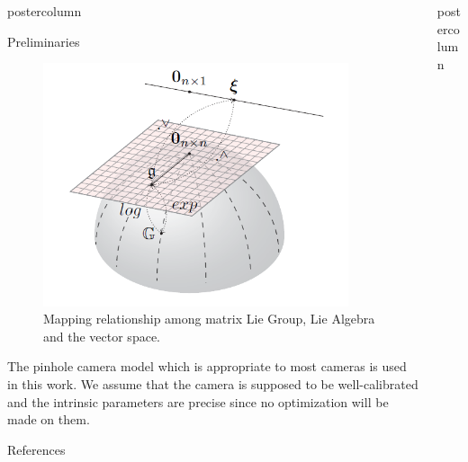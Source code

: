 \documentclass{beamer}
\newlength{\columnheight}
\begin{document}
\begin{frame}
\begin{columns}
\begin{column}{.4\textwidth}
\begin{beamercolorbox}[center]{postercolumn}
\begin{minipage}{.98\textwidth}
{\begin{block}{Preliminaries}
\begin{figure}
							\begin{minipage}{0.45\textwidth}
                    \includegraphics[width=0.9\textwidth]{img/lie.png}
								\caption{Mapping relationship among matrix Lie Group, Lie Algebra and the vector space.}
							\end{minipage}
						\end{figure}
\vspace{1em}
The pinhole camera model which is appropriate to most cameras is used in this work. We assume that the camera is supposed to be well-calibrated and the intrinsic parameters are precise since no optimization will be made on them.  
\end{block}


					\begin{myblock}{References}
						\footnotesize
						
						
					\end{myblock}\vfill

		}\end{minipage}\end{beamercolorbox}
	\end{column}
	\begin{column}{.57\textwidth}
		\begin{beamercolorbox}[center]{postercolumn}
			\begin{minipage}{.98\textwidth} %
				\parbox[t][\columnheight]{\textwidth}{ %
					
}
\end{minipage}
\end{beamercolorbox}
\end{column}
\end{columns}
\end{frame}
\end{document}
